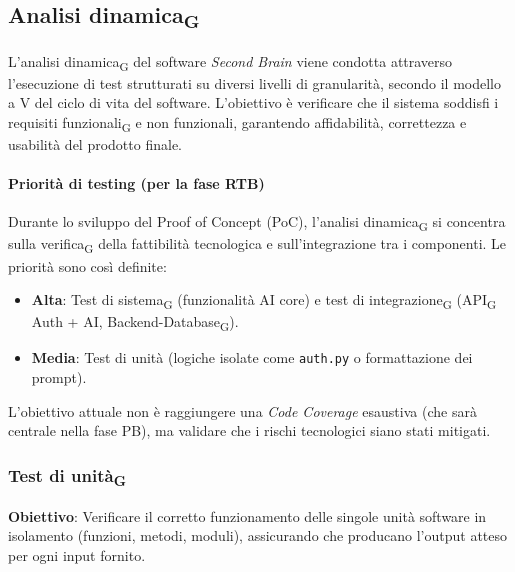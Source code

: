 \documentclass[11pt,a4paper]{article}
\newcommand{\gls}[1]{#1\textsubscript{G}}
\begin{document}
\newpage
\subsection{\gls{Analisi dinamica}}
L'\gls{analisi dinamica} del software \textit{Second Brain} viene condotta attraverso l'esecuzione di test strutturati su diversi livelli di granularità, secondo il modello a V del ciclo di vita del software. L'obiettivo è verificare che il sistema soddisfi i \gls{requisiti funzionali} e non funzionali, garantendo affidabilità, correttezza e usabilità del prodotto finale.

\paragraph{Priorità di testing (per la fase RTB)}
Durante lo sviluppo del Proof of Concept (PoC), l'\gls{analisi dinamica} si concentra sulla \gls{verifica} della fattibilità tecnologica e sull'integrazione tra i componenti. Le priorità sono così definite:
\begin{itemize}
    \item \textbf{Alta}: \gls{Test di sistema} (funzionalità AI core) e \gls{test di integrazione} (\gls{API} Auth + AI, Backend-\gls{Database}).
    \item \textbf{Media}: Test di unità (logiche isolate come \texttt{auth.py} o formattazione dei prompt).
\end{itemize}
L'obiettivo attuale non è raggiungere una \textit{Code Coverage} esaustiva (che sarà centrale nella fase PB), ma validare che i rischi tecnologici siano stati mitigati.

\subsubsection{Test di unità\textsubscript{G}}
\textbf{Obiettivo}: Verificare il corretto funzionamento delle singole unità software in isolamento (funzioni, metodi, moduli), assicurando che producano l'output atteso per ogni input fornito.
\end{document}
